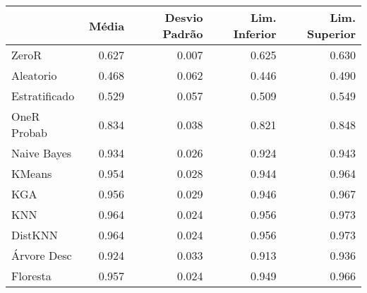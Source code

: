 \begin{table}
\centering
\label{Breast_Cancer_status_table}
\begin{tabular}{lrrrr}
\toprule
{} & Média & Desvio Padrão & Lim. Inferior & Lim. Superior \\
\midrule
ZeroR         & 0.627 &         0.007 &         0.625 &         0.630 \\
Aleatorio     & 0.468 &         0.062 &         0.446 &         0.490 \\
Estratificado & 0.529 &         0.057 &         0.509 &         0.549 \\
OneR Probab   & 0.834 &         0.038 &         0.821 &         0.848 \\
Naive Bayes   & 0.934 &         0.026 &         0.924 &         0.943 \\
KMeans        & 0.954 &         0.028 &         0.944 &         0.964 \\
KGA           & 0.956 &         0.029 &         0.946 &         0.967 \\
KNN           & 0.964 &         0.024 &         0.956 &         0.973 \\
DistKNN       & 0.964 &         0.024 &         0.956 &         0.973 \\
Árvore Desc   & 0.924 &         0.033 &         0.913 &         0.936 \\
Floresta      & 0.957 &         0.024 &         0.949 &         0.966 \\
\bottomrule
\end{tabular}
\end{table}
